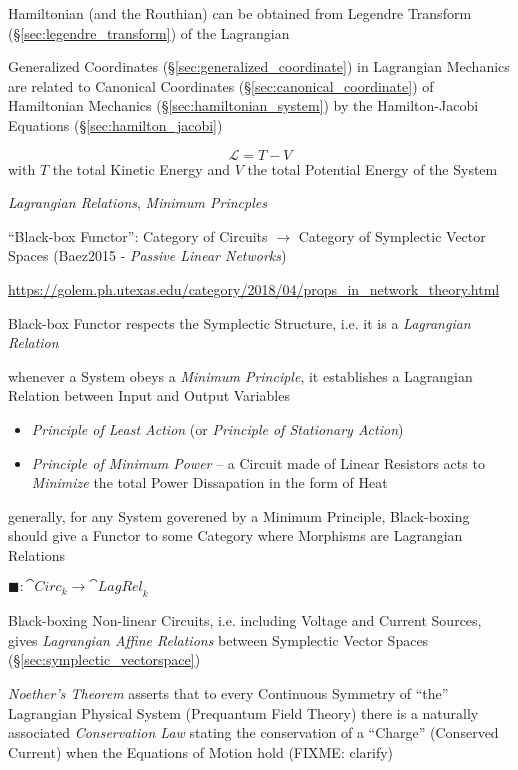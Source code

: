 Hamiltonian (and the Routhian) can be obtained from Legendre Transform
(\S\ref{sec:legendre_transform}) of the Lagrangian

Generalized Coordinates (\S\ref{sec:generalized_coordinate}) in Lagrangian
Mechanics are related to Canonical Coordinates
(\S\ref{sec:canonical_coordinate}) of Hamiltonian Mechanics
(\S\ref{sec:hamiltonian_system}) by the Hamilton-Jacobi Equations
(\S\ref{sec:hamilton_jacobi})

\[
  \mathcal{L} = T - V
\]
with $T$ the total Kinetic Energy and $V$ the total Potential Energy of the
System

\emph{Lagrangian Relations}, \emph{Minimum Princples}

``Black-box Functor'': Category of Circuits $\rightarrow$ Category of
Symplectic Vector Spaces (Baez2015 - \emph{Passive Linear Networks})

\url{https://golem.ph.utexas.edu/category/2018/04/props_in_network_theory.html}

Black-box Functor respects the Symplectic Structure, i.e. it is a
\emph{Lagrangian Relation}

whenever a System obeys a \emph{Minimum Principle}, it establishes a Lagrangian
Relation between Input and Output Variables

\begin{itemize}
  \item \emph{Principle of Least Action} (or \emph{Principle of Stationary
    Action})
  \item \emph{Principle of Minimum Power} -- a Circuit made of Linear Resistors
    acts to \emph{Minimize} the total Power Dissapation in the form of Heat
\end{itemize}

generally, for any System goverened by a Minimum Principle, Black-boxing should
give a Functor to some Category where Morphisms are Lagrangian Relations

$\blacksquare : \cat{Circ}_k \rightarrow \cat{LagRel}_k$

Black-boxing Non-linear Circuits, i.e. including Voltage and Current Sources,
gives \emph{Lagrangian Affine Relations} between Symplectic Vector Spaces
(\S\ref{sec:symplectic_vectorspace})

\asterism

\emph{Noether's Theorem} asserts that to every Continuous Symmetry of ``the''
Lagrangian Physical System (Prequantum Field Theory) there is a naturally
associated \emph{Conservation Law} stating the conservation of a ``Charge''
(Conserved Current) when the Equations of Motion hold (FIXME: clarify)

